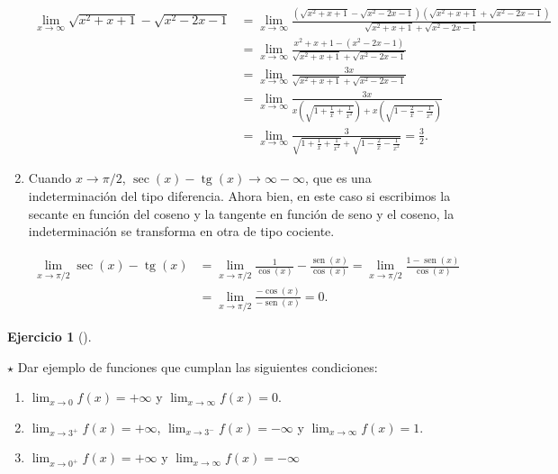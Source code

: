 \documentclass[
  a4paper,
]{scrreport}
\theoremstyle{definition}
\newtheorem{exercise}{Ejercicio}[chapter]
\theoremstyle{remark}
\begin{document}
\begin{tcolorbox}
\begin{enumerate}
  \begin{align*}
  \lim_{x\to \infty} \sqrt{x^2+x+1}-\sqrt{x^2-2x-1}
  &= \lim_{x \to \infty} \frac{(\sqrt{x^2+x+1} - \sqrt{x^2-2x-1})(\sqrt{x^2+x+1} + \sqrt{x^2-2x-1})}{\sqrt{x^2+x+1} + \sqrt{x^2-2x-1}} \\
  &= \lim_{x \to \infty} \frac{x^2+x+1 - (x^2-2x-1)}{\sqrt{x^2+x+1} + \sqrt{x^2-2x-1}} \\
  &= \lim_{x \to \infty} \frac{3x}{\sqrt{x^2+x+1} + \sqrt{x^2-2x-1}} \\
  &= \lim_{x \to \infty} \frac{3x}{x\left(\sqrt{1+\frac{1}{x}+\frac{1}{x^2}}\right) + x\left(\sqrt{1-\frac{2}{x}-\frac{1}{x^2}}\right)} \\
  &= \lim_{x \to \infty} \frac{3}{\sqrt{1+\frac{1}{x}+\frac{1}{x^2}} + \sqrt{1-\frac{2}{x}-\frac{1}{x^2}}} 
  = \frac{3}{2}.
  \end{align*}
\item
  Cuando \(x\to \pi/2\),
  \(\sec(x)-\operatorname{tg}(x) \to \infty-\infty\), que es una
  indeterminación del tipo diferencia. Ahora bien, en este caso si
  escribimos la secante en función del coseno y la tangente en función
  de seno y el coseno, la indeterminación se transforma en otra de tipo
  cociente.

  \begin{align*}
  \lim_{x\to \pi/2}\sec(x)-\operatorname{tg}(x)
  &= \lim_{x\to \pi/2}\frac{1}{\cos(x)}-\frac{\operatorname{sen}(x)}{\cos(x)}
  = \lim_{x\to \pi/2}\frac{1-\operatorname{sen}(x)}{\cos(x)} \\
  &= \lim_{x\to \pi/2}\frac{-\cos(x)}{-\operatorname{sen}(x)}
  = 0. \tag{L'Hôpital}
  \end{align*}
\end{enumerate}

\end{tcolorbox}

\begin{exercise}[]\protect\hypertarget{exr-ejemplos-limites-laterales}{}\label{exr-ejemplos-limites-laterales}

\(\star\) Dar ejemplo de funciones que cumplan las siguientes
condiciones:

\begin{enumerate}
\def\labelenumi{\alph{enumi}.}
\item
  \(\lim_{x\to 0}f(x)=+\infty\) y \(\lim_{x\to \infty}f(x)=0\).
\item
  \(\lim_{x\to 3^+}f(x)=+\infty\), \(\lim_{x\to 3^-}f(x)=-\infty\) y
  \(\lim_{x\to \infty}f(x)=1\).
\item
  \(\lim_{x\to 0^+}f(x)=+\infty\) y \(\lim_{x\to \infty}f(x)=-\infty\)
\end{enumerate}

\end{exercise}
\end{document}
